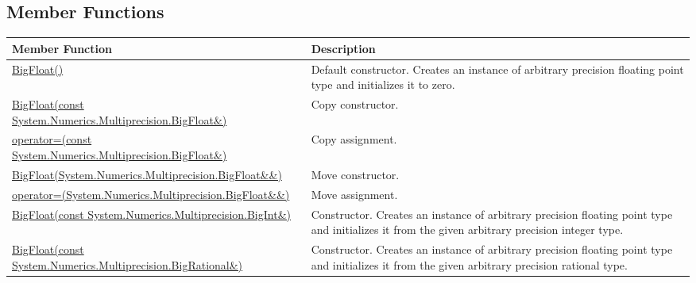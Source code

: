 \documentclass[a4paper,oneside,11.000000pt]{book}
\begin{document}
\subsection{Member Functions}
\begin{flushleft}
\begin{supertabular}[l]{!{\raggedright}p{7.575cm}!{\raggedright}p{7.575cm}}
\textbf{Member Function}
& \textbf{Description}
\\
\hline
\hyperlink{System.Numerics.Multiprecision.BigFloat.constructor.P.System.Numerics.Multiprecision.BigFloat}{BigFloat()}
& Default constructor. Creates an instance of arbitrary precision floating point type and initializes it to zero.

\\
\hyperlink{System.Numerics.Multiprecision.BigFloat.constructor.P.System.Numerics.Multiprecision.BigFloat.C.R.System.Numerics.Multiprecision.BigFloat}{BigFloat(const System.\-Numerics.\-Multiprecision.\-BigFloat\&\-)}
& Copy constructor.

\\
\hyperlink{System.Numerics.Multiprecision.BigFloat.operator.assign.P.System.Numerics.Multiprecision.BigFloat.C.R.System.Numerics.Multiprecision.BigFloat}{operator=(const System.\-Numerics.\-Multiprecision.\-BigFloat\&\-)}
& Copy assignment.

\\
\hyperlink{System.Numerics.Multiprecision.BigFloat.constructor.P.System.Numerics.Multiprecision.BigFloat.RR.System.Numerics.Multiprecision.BigFloat}{BigFloat(System.\-Numerics.\-Multiprecision.\-BigFloat\&\-\&\-)}
& Move constructor.

\\
\hyperlink{System.Numerics.Multiprecision.BigFloat.operator.assign.P.System.Numerics.Multiprecision.BigFloat.RR.System.Numerics.Multiprecision.BigFloat}{operator=(System.\-Numerics.\-Multiprecision.\-BigFloat\&\-\&\-)}
& Move assignment.

\\
\hyperlink{System.Numerics.Multiprecision.BigFloat.constructor.P.System.Numerics.Multiprecision.BigFloat.C.R.System.Numerics.Multiprecision.BigInt}{BigFloat(const System.\-Numerics.\-Multiprecision.\-BigInt\&\-)}
& Constructor. Creates an instance of arbitrary precision floating point type and initializes it from the given arbitrary precision integer type.

\\
\hyperlink{System.Numerics.Multiprecision.BigFloat.constructor.P.System.Numerics.Multiprecision.BigFloat.C.R.System.Numerics.Multiprecision.BigRational}{BigFloat(const System.\-Numerics.\-Multiprecision.\-BigRational\&\-)}
& Constructor. Creates an instance of arbitrary precision floating point type and initializes it from the given arbitrary precision rational type.


\end{supertabular}
\end{flushleft}
\end{document}
